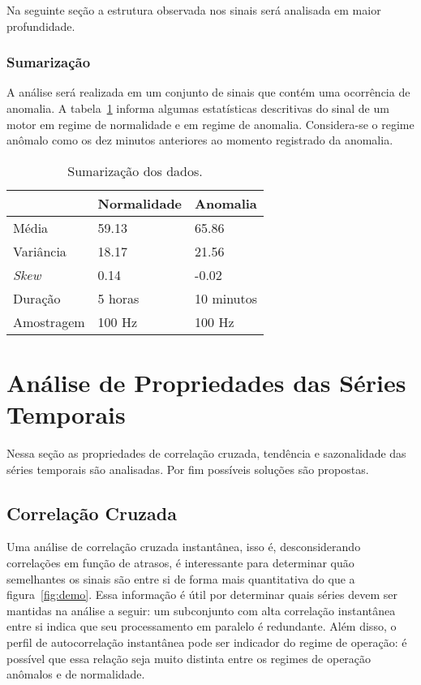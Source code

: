 Na seguinte seção a estrutura observada nos sinais será analisada em maior
profundidade.


\subsubsection{Sumarização}

A análise será realizada em um conjunto de sinais que contém uma ocorrência de
anomalia. A tabela~\ref{tab:summ} informa algumas estatísticas descritivas do
sinal de um motor em regime de normalidade e em regime de anomalia.
Considera-se o regime anômalo como os dez minutos anteriores ao momento
registrado da anomalia.

\begin{table}[H]
\centering
\begin{tabular}{|l|l|l|}
\hline
           & \textbf{Normalidade} & \textbf{Anomalia} \\ \hline
Média      & 59.13                &  65.86            \\ \hline
Variância  & 18.17                &  21.56            \\ \hline
\emph{Skew}& 0.14                 &  -0.02            \\ \hline
Duração    & 5 horas              &  10 minutos       \\ \hline
Amostragem &  100 Hz              &  100 Hz           \\ \hline
\end{tabular}
\caption{Sumarização dos dados.}
\label{tab:summ}
\end{table}

\section{Análise de Propriedades das Séries Temporais}

Nessa seção as propriedades de correlação cruzada, tendência e sazonalidade
das séries temporais são analisadas. Por fim possíveis soluções são propostas.

\subsection{Correlação Cruzada}\label{ssec:ccorr}

Uma análise de correlação cruzada instantânea, isso é, desconsiderando
correlações em função de atrasos, é interessante para determinar quão
semelhantes os sinais são entre si de forma mais quantitativa do que a
figura~\ref{fig:demo}. Essa informação é útil por determinar quais séries devem
ser mantidas na análise a seguir: um subconjunto com alta correlação
instantânea entre si indica que seu processamento em paralelo é redundante.
Além disso, o perfil de autocorrelação instantânea pode ser indicador do regime
de operação: é possível que essa relação seja muito distinta entre os regimes
de operação anômalos e de normalidade.

